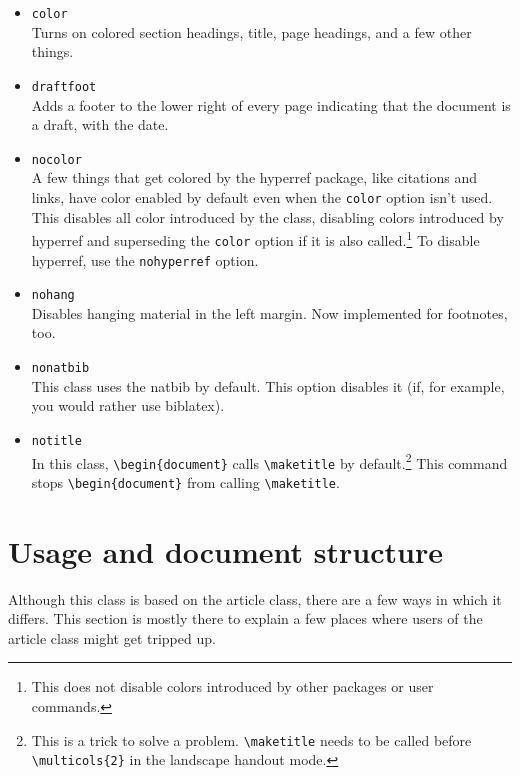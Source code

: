 \documentclass[11pt, tipa, color]{./lingdoc}
\newcommand{\Command}[1]{\texttt{\textbackslash{}#1}}
\newcommand{\Option}[1]{\texttt{#1}}
\newcommand{\Package}[1]{\textsf{{#1}}}
\begin{document}
    \begin{itemize}[leftmargin=0em]
      \item \Option{color} \\ Turns on colored section headings, title, page headings, and a few other things.
      
      \item \Option{draftfoot} \\ Adds a footer to the lower right of every page indicating that the document is a draft, with the date.

      \item \Option{nocolor} \\ A few things that get colored by the \Package{hyperref} package, like citations and links, have color enabled by default even when the \Option{color} option isn't used. This disables all color introduced by the class, disabling colors introduced by \Package{hyperref} and superseding the \Option{color} option if it is also called.\footnote{This does not disable colors introduced by other packages or user commands.} To disable \Package{hyperref}, use the \Option{nohyperref} option.
          
      \item \Option{nohang} \\ Disables hanging material in the left margin. Now implemented for footnotes, too.

	\item \Option{nonatbib} \\ This class uses the \Package{natbib} by default. This option disables it (if, for example, you would rather use \Package{biblatex}).
    
	\item \Option{notitle} \\ In this class, \Command{begin\{document\}} calls \Command{maketitle} by default.\footnote{This is a trick to solve a problem. \Command{maketitle} needs to be called before \Command{multicols\{2\}} in the landscape handout mode.} This command stops \Command{begin\{document\}} from calling \Command{maketitle}.
      
    \end{itemize}

  \section{Usage and document structure}
  
    Although this class is based on the \Package{article} class, there are a few ways in which it differs. This section is mostly there to explain a few places where users of the \Package{article} class might get tripped up.
  
\end{document}
